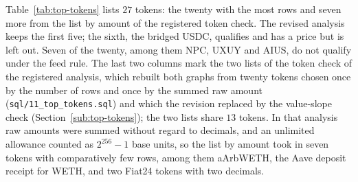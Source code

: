 Table~\ref{tab:top-tokens} lists $27$ tokens: the twenty with the most rows and seven more from the list by amount of the registered token check. The revised analysis keeps the first five; the sixth, the bridged USDC, qualifies and has a price but is left out. Seven of the twenty, among them NPC, UXUY and AIUS, do not qualify under the feed rule. The last two columns mark the two lists of the token check of the registered analysis, which rebuilt both graphs from twenty tokens chosen once by the number of rows and once by the summed raw amount (\texttt{sql/11\_top\_tokens.sql}) and which the revision replaced by the value-slope check (Section~\ref{sub:top-tokens}); the two lists share $13$ tokens. In that analysis raw amounts were summed without regard to decimals, and an unlimited allowance counted as $2^{256}-1$ base units, so the list by amount took in seven tokens with comparatively few rows, among them aArbWETH, the Aave deposit receipt for WETH, and two Fiat24 tokens with two decimals.

